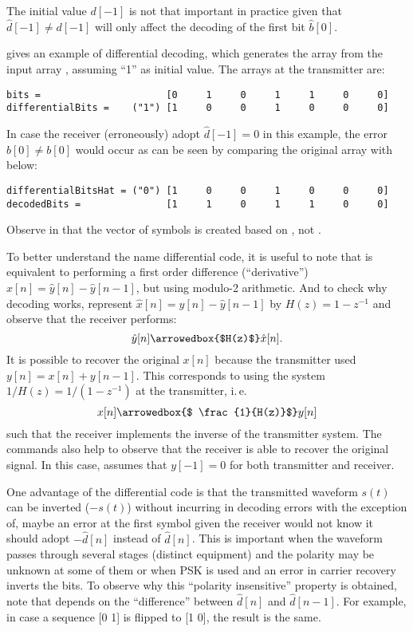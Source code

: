The initial value $d[-1]$ is
not that important in practice given that $\hat d[-1] \ne d[-1]$ will only affect the decoding of the
first bit $\hat b[0]$.

 gives an example of differential decoding, which generates the array  from the input array , assuming ``1'' as initial value. The arrays at the transmitter are:
\begin{verbatim}
bits =                      [0     1     0     1     1     0     0]
differentialBits =    ("1") [1     0     0     1     0     0     0]
\end{verbatim}
In case the receiver (erroneously) adopt $\hat d[-1] = 0$ in this example, 
the error $\hat b[0] \ne b[0]$ would occur as can be seen by comparing the original array 
 with  below:
\begin{verbatim}
differentialBitsHat = ("0") [1     0     0     1     0     0     0]
decodedBits =               [1     1     0     1     1     0     0]
\end{verbatim}


Observe in  that the vector of symbols  is created based
on , not .

To better understand the name differential code, it is useful to note that  is equivalent to performing a first order difference (``derivative'') $\hat x[n]=\hat y[n]- \hat y[n-1]$, but using modulo-2 arithmetic. And to check why decoding works, represent $\hat x[n]= \hat y[n]- \hat y[n-1]$ by $H(z)=1-z^{-1}$ and observe that the receiver performs:
\[
\hat y[n] \arrowedbox{$H(z)$} \hat x[n].
\]
It is possible to recover the original $x[n]$ because the transmitter 
used $y[n]= x[n] + y[n-1]$. This corresponds to using the system
$1/H(z) = 1/(1-z^{-1})$ at the transmitter, i.\,e.
\[
x[n] \arrowedbox{$ \frac{1}{H(z)}$} y[n]
\]
such that the receiver implements the inverse of the transmitter system.
The commands  also help to observe that the receiver is able to recover the original signal. In this case,  assumes that $y[-1]=0$ for both transmitter and receiver. 

One advantage of the differential code is that the transmitted waveform $s(t)$ can be inverted ($-s(t)$) without incurring in decoding errors with the exception of, maybe an error at the first symbol given the receiver would not know it should adopt $-\hat d[n]$ instead of $\hat d[n]$. This is important when the waveform passes through several stages (distinct equipment) and the polarity may be unknown at some of them or when PSK is used and an error in carrier recovery inverts the bits. To observe why this ``polarity insensitive'' property is obtained, note that  depends on the ``difference'' between $\hat d[n]$ and $\hat d[n-1]$. For example, in case a sequence [0 1] is flipped to [1 0], the result is the same. 

